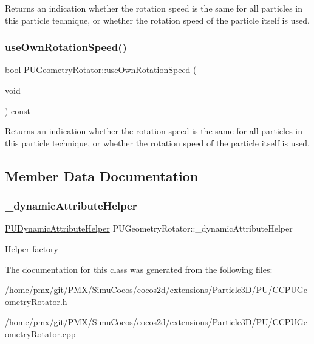 Returns an indication whether the rotation speed is the same for all particles in this particle technique, or whether the rotation speed of the particle itself is used. \mbox{\label{classPUGeometryRotator_a112e63c42288c669fd121000a75444ba}} 
\subsubsection{\texorpdfstring{use\+Own\+Rotation\+Speed()}{useOwnRotationSpeed()}\hspace{0.1cm}{\footnotesize\ttfamily [2/2]}}
{\footnotesize\ttfamily bool P\+U\+Geometry\+Rotator\+::use\+Own\+Rotation\+Speed (\begin{DoxyParamCaption}\item[{void}]{ }\end{DoxyParamCaption}) const}

Returns an indication whether the rotation speed is the same for all particles in this particle technique, or whether the rotation speed of the particle itself is used. 

\subsection{Member Data Documentation}
\mbox{\label{classPUGeometryRotator_a98df091d6ab6a08d48f489ad20de67ce}} 
\subsubsection{\texorpdfstring{\+\_\+dynamic\+Attribute\+Helper}{\_dynamicAttributeHelper}}
{\footnotesize\ttfamily \hyperlink{classPUDynamicAttributeHelper}{P\+U\+Dynamic\+Attribute\+Helper} P\+U\+Geometry\+Rotator\+::\+\_\+dynamic\+Attribute\+Helper\hspace{0.3cm}{\ttfamily [protected]}}

Helper factory 

The documentation for this class was generated from the following files\+:\begin{DoxyCompactItemize}
\item 
/home/pmx/git/\+P\+M\+X/\+Simu\+Cocos/cocos2d/extensions/\+Particle3\+D/\+P\+U/C\+C\+P\+U\+Geometry\+Rotator.\+h\item 
/home/pmx/git/\+P\+M\+X/\+Simu\+Cocos/cocos2d/extensions/\+Particle3\+D/\+P\+U/C\+C\+P\+U\+Geometry\+Rotator.\+cpp\end{DoxyCompactItemize}
